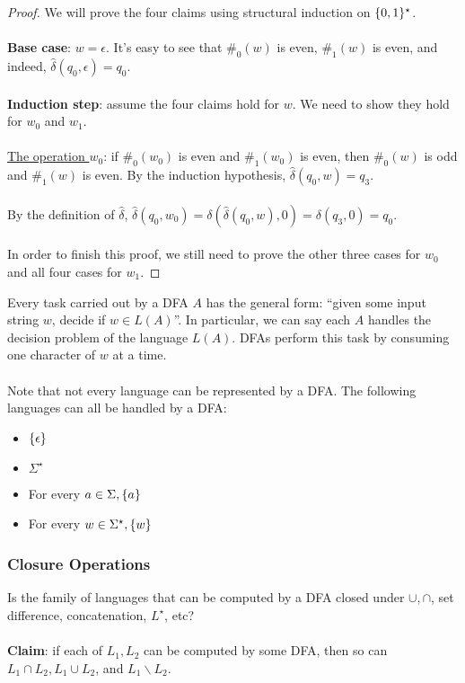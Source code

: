\documentclass[]{article}
\DeclarePairedDelimiter{\set}{\lbrace}{\rbrace}
\theoremstyle{definition}
\begin{document}
      \begin{proof}
        We will prove the four claims using structural induction on $\set{0, 1}^\star$.
        \\ \\
        \textbf{Base case}: $w = \epsilon$. It's easy to see that $\#_0(w)$ is even, $\#_1(w)$ is even, and indeed, $\hat{\delta}(q_0, \epsilon) = q_0$.
        \\ \\
        \textbf{Induction step}: assume the four claims hold for $w$. We need to show they hold for $w_0$ and $w_1$.
        \\ \\
        \underline{The operation $w_0$}: if $\#_0(w_0)$ is even and $\#_1(w_0)$ is even, then $\#_0(w)$ is odd and $\#_1(w)$ is even. By the induction hypothesis, $\hat{\delta}({q_0, w}) = q_3$.
        \\ \\
        By the definition of $\hat{\delta}$, $\hat{\delta}(q_0, w_0) = \delta( \hat{\delta}(q_0, w), 0) = \delta(q_3, 0) = q_0$.
        \\ \\
        In order to finish this proof, we still need to prove the other three cases for $w_0$ and all four cases for $w_1$.
      \end{proof}

      Every task carried out by a DFA $A$ has the general form: ``given some input string $w$, decide if $w \in L(A)$''. In particular, we can say each $A$ handles the decision problem of the language $L(A)$. DFAs perform this task by consuming one character of $w$ at a time.
      \\ \\
      Note that not every language can be represented by a DFA. The following languages can all be handled by a DFA:
      \begin{itemize}
        \item $\set{ \epsilon }$
        \item $\Sigma^\star$
        \item For every $a \in \Sigma, \set{a}$
        \item For every $w \in \Sigma^\star, \set{w}$
      \end{itemize}

      \subsubsection{Closure Operations}
        Is the family of languages that can be computed by a DFA closed under $\cup, \cap$, set difference, concatenation, $L^\star$, etc?
        \\ \\
        \textbf{Claim}: if each of $L_1, L_2$ can be computed by some DFA, then so can $L_1 \cap L_2, L_1 \cup L_2$, and $L_1 \backslash L_2$.
\end{document}
